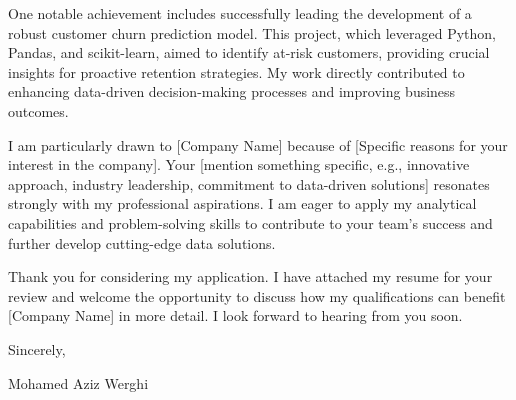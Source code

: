 \documentclass[10pt]{article}
\begin{document}
One notable achievement includes successfully leading the development of a robust customer churn prediction model. This project, which leveraged Python, Pandas, and scikit-learn, aimed to identify at-risk customers, providing crucial insights for proactive retention strategies. My work directly contributed to enhancing data-driven decision-making processes and improving business outcomes.

I am particularly drawn to [Company Name] because of [Specific reasons for your interest in the company]. Your [mention something specific, e.g., innovative approach, industry leadership, commitment to data-driven solutions] resonates strongly with my professional aspirations. I am eager to apply my analytical capabilities and problem-solving skills to contribute to your team's success and further develop cutting-edge data solutions.

Thank you for considering my application. I have attached my resume for your review and welcome the opportunity to discuss how my qualifications can benefit [Company Name] in more detail. I look forward to hearing from you soon.

Sincerely,

Mohamed Aziz Werghi
\end{document}
